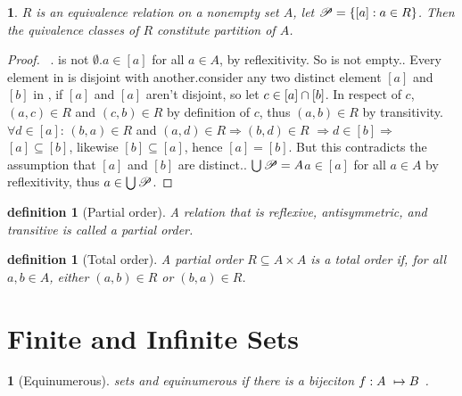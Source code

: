 \newtheorem{equivalencepartition}[theorem_root]{\theorem}
\begin{equivalencepartition}
    $R$ is an equivalence relation on a nonempty set $A$,
    let $\partitionset = \{[a]: a\in R\}$. Then the quivalence classes of $R$ constitute partition of $A$. 
\end{equivalencepartition}
\begin{proof}
\ . \partitionset is not $\emptyset$.\qquad  $a\in [a]$ for all $a\in A$, by reflexitivity. So \partitionset is not empty.. Every element in \partitionset is disjoint with another.\qquad consider any two distinct element
$[a]$ and $[b]$ in \partitionset, if $[a]$ and $[a]$ aren't disjoint, so let $c\in [a]\cap [b]$.
In respect of $c$, $(a,c)\in R$ and $(c, b)\in R$ by definition of $c$, thus $(a, b)\in R$ by transitivity.
$\forall d\in [a]$:\newline
$(b,a)\in R$ and $(a,d)\in R$\quad$\Longrightarrow$\quad $(b, d)\in R$
\quad$\Longrightarrow$\quad $d\in [b]$\quad$\Longrightarrow$\qquad $[a]\subseteq [b]$, likewise $[b]\subseteq [a]$, 
hence $[a] = [b]$. But this contradicts the assumption that $[a]$ and $[b]$ are distinct.. $\bigcup\partitionset = A$\quad $a\in [a]$ for all $a\in A$ by reflexitivity, thus $a\in\bigcup\partitionset$.
\end{proof}

\newtheorem{partialorder}[theorem_root]{definition}
\begin{partialorder}[Partial order]
A relation that is reflexive, antisymmetric, and transitive is called a partial order.
\end{partialorder}

\newtheorem{totalorder}[theorem_root]{definition}
\begin{totalorder}[Total order]
A partial order $R\subseteq A\times A$ is a total order if, for all $a, b\in A$, either
$(a,b)\in R$ or $(b, a)\in R$.
\end{totalorder}

\section{Finite and Infinite Sets}
\newtheorem{equinumerous}[theorem_root]{}
\begin{equinumerous}[Equinumerous]
    sets \ua and \ub equinumerous if there is a bijeciton $f:\ua\mapsto\ub$.
\end{equinumerous}

